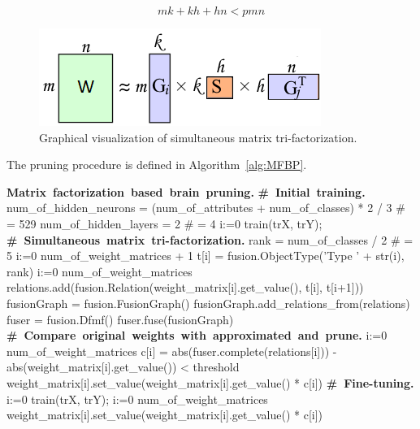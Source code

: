 \documentclass{article} %
\begin{document}
\begin{equation} \label{eq:1}
 mk + kh + hn < pmn
\end{equation}



\begin{figure}[!ht]
\centering 
\includegraphics[width=.5\textwidth]{mf2.png}
\caption{Graphical visualization of simultaneous matrix tri-factorization.}
\label{f:mf2}
\end{figure}



The pruning procedure is defined in Algorithm~\ref{alg:MFBP}.


\begin{small}
\label{alg:MFBP}
\begin{program}
\mbox{\textbf{Matrix factorization based brain pruning.}}
\mbox{\textbf{\# Initial training.}}
  num\_of\_hidden\_neurons = (num\_of\_attributes + num\_of\_classes) * 2 / 3 \# = 529
  num\_of\_hidden\_layers = 2 \# = 4
  \FOR i:=0  \DO 
     train(trX, trY); 
  \OD
\mbox{\textbf{\# Simultaneous matrix tri-factorization.}}
  rank = num\_of\_classes / 2 \# = 5   
  \FOR i:=0 \TO num\_of\_weight\_matrices + 1 \DO
     t[i] = fusion.ObjectType('Type ' + str(i), rank)
  \OD
  \FOR i:=0 \TO num\_of\_weight\_matrices \DO
     relations.add(fusion.Relation(weight\_matrix[i].get\_value(), t[i], t[i+1])) 
  \OD
  fusionGraph = fusion.FusionGraph()
  fusionGraph.add\_relations\_from(relations)
  fuser = fusion.Dfmf()
  fuser.fuse(fusionGraph) 
\mbox{\textbf{\# Compare original weights with approximated and prune.}}
  \FOR i:=0 \TO num\_of\_weight\_matrices \DO
  	  c[i] = abs(fuser.complete(relations[i])) - abs(weight\_matrix[i].get\_value()) < threshold
      weight\_matrix[i].set\_value(weight\_matrix[i].get\_value() * c[i])
  \OD
\mbox{\textbf{\# Fine-tuning.}}
  \FOR i:=0  \DO 
     train(trX, trY); 
     \FOR i:=0 \TO num\_of\_weight\_matrices \DO
      weight\_matrix[i].set\_value(weight\_matrix[i].get\_value() * c[i])
     \OD     
  \OD
\end{program}
\end{small}
\end{document}
